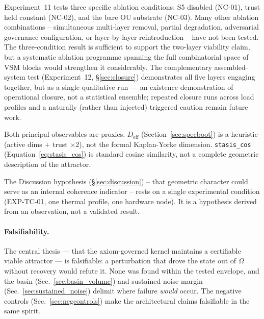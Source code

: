 \documentclass[11pt, a4paper]{article}
\begin{document}
\begin{description}[itemsep=0.55em]
  \item[Architecture ablation scope]
    Experiment~11 tests three specific ablation conditions: S5 disabled
    (NC-01), trust held constant (NC-02), and the bare OU substrate (NC-03).
    Many other ablation combinations -- simultaneous multi-layer removal,
    partial degradation, adversarial governance configuration, or
    layer-by-layer reintroduction -- have not been tested.
    The three-condition result is sufficient to support the two-layer
    viability claim, but a systematic ablation programme spanning the
    full combinatorial space of VSM blocks would strengthen it
    considerably.
    The complementary assembled-system test (Experiment~12,
    \S\ref{sec:closure}) demonstrates all five layers engaging together, but as a
    single qualitative run --- an existence demonstration of operational closure,
    not a statistical ensemble; repeated closure runs across load profiles and a
    naturally (rather than injected) triggered caution remain future work.

  \item[Proxy metrics]
    Both principal observables are proxies.
    $D_\text{eff}$ (Section~\ref{sec:specboot}) is a heuristic (active dims
    $+$ trust $\times 2$), not the formal Kaplan-Yorke dimension.
    \texttt{stasis\_cos} (Equation~\ref{eq:stasis_cos}) is standard cosine
    similarity, not a complete geometric description of the attractor.

  \item[Alignment: single observation, not systematic validation]
    The Discussion hypothesis (\S\ref{sec:discussion}) -- that geometric
    character could serve as an internal coherence indicator -- rests on
    a single experimental condition (EXP-TC-01, one thermal profile, one
    hardware node).
    It is a hypothesis derived from an observation, not a validated result.

\end{description}

\paragraph{Falsifiability.} The central thesis --- that the axiom-governed kernel
maintains a certifiable viable attractor --- is falsifiable: a perturbation that
drove the state out of $\Omega$ without recovery would refute it. None was found
within the tested envelope, and the basin (Sec.~\ref{sec:basin_volume}) and
sustained-noise margin (Sec.~\ref{sec:sustained_noise}) delimit where failure
\emph{would} occur. The negative controls (Sec.~\ref{sec:negcontrols}) make the
architectural claims falsifiable in the same spirit.
\end{document}
